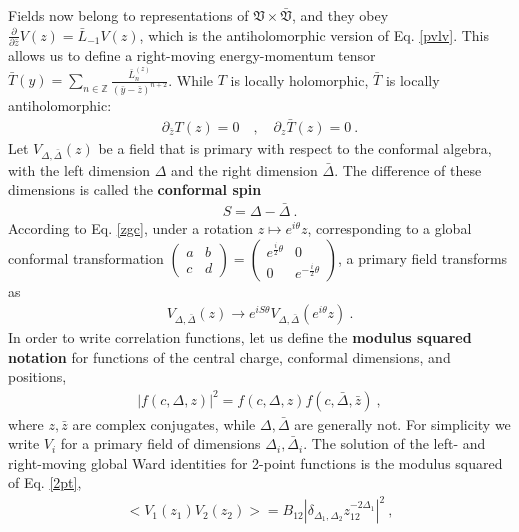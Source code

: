 \documentclass[12pt, a4paper]{article}
\newcommand{\myindex}[1]{\textbf{\boldmath #1}}
\theoremstyle{break}
\begin{document}
Fields now belong to representations of $\mathfrak{V}\times \bar{\mathfrak{V}}$, and they obey $\frac{\partial}{\partial \bar z} V(z) = \bar L_{-1} V(z)$, which is the antiholomorphic version of Eq. \eqref{pvlv}. This allows us to define a right-moving energy-momentum tensor $\bar T(y) = \sum_{n\in\mathbb{Z}} \frac{\bar L_n^{(z)}}{(\bar y-\bar z)^{n+2}}$. While $T$ is locally holomorphic, $\bar T$ is locally antiholomorphic:
\begin{align}
 \partial_{\bar z} T(z) = 0 \quad , \quad \partial_z \bar T(z) = 0 \ . 
\end{align}
Let $V_{\Delta,\bar\Delta}(z)$ be a field that is primary with respect to the conformal algebra, with the left dimension $\Delta$ and the right dimension $\bar\Delta$. The difference of these dimensions is called the \myindex{conformal spin}
\begin{align}
 S = \Delta -\bar\Delta\ . 
 \label{sdd} 
\end{align}
According to Eq. \eqref{zgc}, 
under a rotation $z\mapsto e^{i\theta}z$, corresponding to a global conformal transformation $\left(\begin{smallmatrix} a & b \\ c & d\end{smallmatrix}\right)= \left(\begin{smallmatrix} e^{\frac{i}{2}\theta} & 0 \\ 0 &  e^{-\frac{i}{2}\theta}\end{smallmatrix}\right)$, a primary field transforms as 
\begin{align}
 V_{\Delta,\bar\Delta}(z) \to  e^{iS\theta} V_{\Delta,\bar\Delta}\left(e^{i\theta} z\right) \ .
 \label{veis}
\end{align}
In order to write correlation functions, let us define the \myindex{modulus squared notation} for functions of the central charge, conformal dimensions, and positions,
\begin{align}
 \left| f(c,\Delta, z)\right|^2 = f(c,\Delta, z)f(c,\bar\Delta,\bar z)\ ,
 \label{fdz2}
\end{align}
where $z,\bar z$ are complex conjugates, while $\Delta,\bar\Delta$ are generally not. 
For simplicity we write $V_i$ for a primary field of dimensions $\Delta_i,\bar\Delta_i$.
The solution of the left- and right-moving global Ward identities for 2-point functions is the modulus squared of Eq. \eqref{2pt},
\begin{align}
\boxed{ \Big< V_1(z_1)V_2(z_2) \Big> = B_{12} \left|\delta_{\Delta_1,\Delta_2} z_{12}^{-2\Delta_1}\right|^2} \ ,
\label{2ptb}
\end{align}
\end{document}
